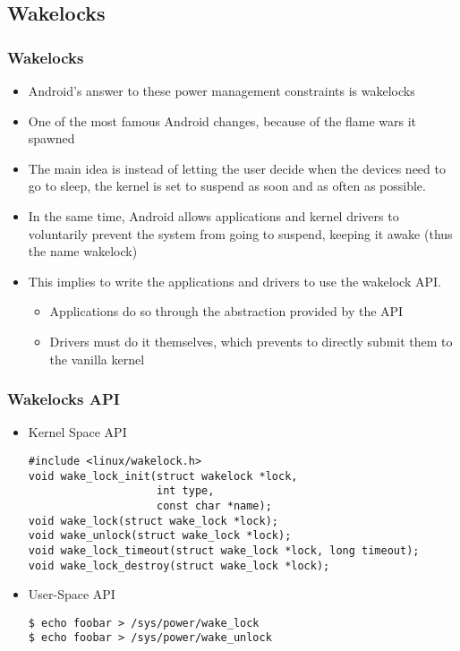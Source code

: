 \subsection{Wakelocks}
\begin{frame}
  \frametitle{Wakelocks}
  \begin{itemize}
  \item Android's answer to these power management constraints is wakelocks
  \item One of the most famous Android changes, because of the
    flame wars it spawned
  \item The main idea is instead of letting the user decide when
    the devices need to go to sleep, the kernel is set to suspend as
    soon and as often as possible.
  \item In the same time, Android allows applications and kernel
    drivers to voluntarily prevent the system from going to suspend,
    keeping it awake (thus the name wakelock)
  \item This implies to write the applications and drivers to use the
    wakelock API.
    \begin{itemize}
    \item Applications do so through the abstraction provided by the
      API
    \item Drivers must do it themselves, which prevents to directly
      submit them to the vanilla kernel
    \end{itemize}
  \end{itemize}
\end{frame}

\begin{frame}[fragile]
  \frametitle{Wakelocks API}
  \begin{itemize}
  \item Kernel Space API
\begin{verbatim}
#include <linux/wakelock.h>
void wake_lock_init(struct wakelock *lock,
                    int type,
                    const char *name);
void wake_lock(struct wake_lock *lock);
void wake_unlock(struct wake_lock *lock);
void wake_lock_timeout(struct wake_lock *lock, long timeout);
void wake_lock_destroy(struct wake_lock *lock);
\end{verbatim}
  \item User-Space API
\begin{verbatim}
$ echo foobar > /sys/power/wake_lock
$ echo foobar > /sys/power/wake_unlock
\end{verbatim}
\end{itemize}
\end{frame}
